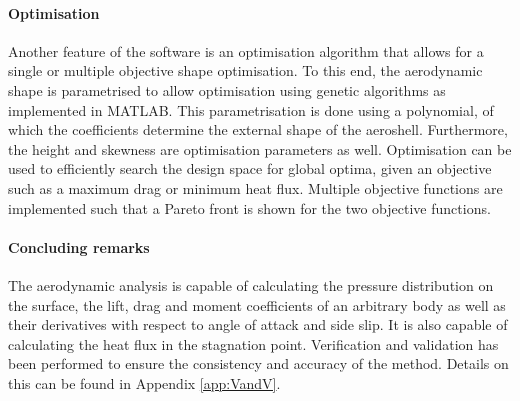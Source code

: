 \paragraph{Optimisation} \label{par:Optimisation}
Another feature of the software is an optimisation algorithm that allows for a single or multiple objective shape optimisation. To this end, the aerodynamic shape is parametrised to allow optimisation using genetic algorithms as implemented in MATLAB. This parametrisation is done using a polynomial, of which the coefficients determine the external shape of the aeroshell. Furthermore, the height and skewness are optimisation parameters as well. Optimisation can be used to efficiently search the design space for global optima, given an objective such as a maximum drag or minimum heat flux. Multiple objective functions are implemented such that a Pareto front is shown for the two objective functions.

\paragraph{Concluding remarks}
The aerodynamic analysis is capable of calculating the pressure distribution on the surface, the lift, drag and moment coefficients of an arbitrary body as well as their derivatives with respect to angle of attack and side slip. It is also capable of calculating the heat flux in the stagnation point. Verification and validation has been performed to ensure the consistency and accuracy of the method. Details on this can be found in Appendix \ref{app:VandV}.







